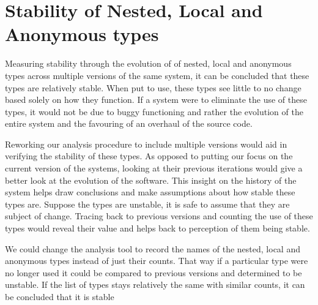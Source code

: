 \documentclass{assignment}
\begin{document}
\section*{Stability of Nested, Local and Anonymous types }

Measuring stability through the evolution of of nested, local and anonymous types across multiple versions of the same system, it can be concluded that these types are relatively stable. When put to use, these types see little to no change based solely on how they function. If a system were to eliminate the use of these types, it would not be due to buggy functioning and rather the evolution of the entire system and the favouring of an overhaul of the source code. 

	Reworking our analysis procedure to include multiple versions would aid in verifying the stability of these types. As opposed to putting our focus on the current version of the systems, looking at their previous iterations would give a better look at the evolution of the software. This insight on the history of the system helps draw conclusions and make assumptions about how stable these types are. Suppose the types are unstable, it is safe to assume that they are subject of change. Tracing back to previous versions and counting the use of these types would reveal their value and helps back to perception of them being stable.

We could change the analysis tool to record the names of the nested, local and anonymous types instead of just their counts. That way if a particular type were no longer used it could be compared to previous versions and determined to be unstable. If the list of types stays relatively the same with similar counts, it can be concluded that it is stable
\end{document}
